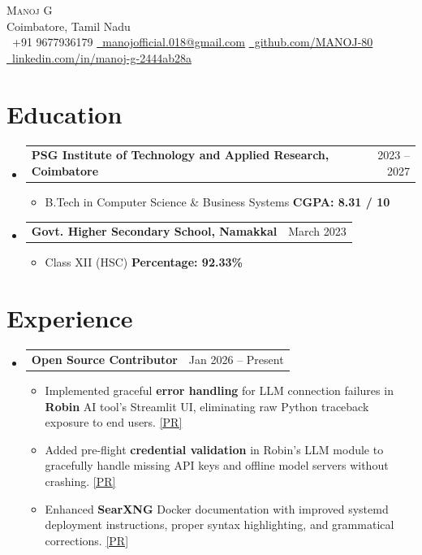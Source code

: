 \documentclass[letterpaper,11pt]{article}
\makeatletter
\newcommand{\resumeItem}[1]{\item\small{#1}}
\newcommand{\resumeSubHeadingListStart}{\begin{itemize}[leftmargin=0in, label={}]}
\newcommand{\resumeSubHeadingListEnd}{\end{itemize}}
\newcommand{\resumeItemListStart}{\begin{itemize}}
\newcommand{\resumeItemListEnd}{\end{itemize}\vspace{-6pt}}
\newcommand{\resumeProjectHeading}[2]{
\item
\begin{tabular*}{1.0\textwidth}{l@{\extracolsep{\fill}}r}
\textbf{#1} & \small #2 \\
\end{tabular*}\vspace{-4pt}
}
\makeatother
\begin{document}
\begin{center}
{\Huge \scshape Manoj G} \\ \vspace{2pt}
Coimbatore, Tamil Nadu \\ \vspace{2pt}
\small
\faPhone\ +91 9677936179 \quad
\href{mailto:manojofficial.018@gmail.com}{\faEnvelope\ manojofficial.018@gmail.com} \quad
\href{https://github.com/MANOJ-80}{\faGithub\ github.com/MANOJ-80} \quad
\href{https://www.linkedin.com/in/manoj-g-2444ab28a/}{\faLinkedin\ linkedin.com/in/manoj-g-2444ab28a}
\vspace{-8pt}
\end{center}

\section{Education}
\resumeSubHeadingListStart

  \resumeProjectHeading
    {\textbf{PSG Institute of Technology and Applied Research}, Coimbatore}{2023 -- 2027}
    \resumeItemListStart
        \resumeItem{B.Tech in Computer Science \& Business Systems \hfill \textbf{CGPA: 8.31 / 10}}
    \resumeItemListEnd

  \resumeProjectHeading
    {\textbf{Govt. Higher Secondary School}, Namakkal}{March 2023}
    \resumeItemListStart
        \resumeItem{Class XII (HSC) \hfill \textbf{Percentage: 92.33\%}}
    \resumeItemListEnd

\resumeSubHeadingListEnd

\section{Experience}
\resumeSubHeadingListStart
\resumeProjectHeading
  {\textbf{Open Source Contributor}}{Jan 2026 -- Present}
  \resumeItemListStart
    \resumeItem{Implemented graceful \textbf{error handling} for LLM connection failures in \textbf{Robin} AI tool's Streamlit UI, eliminating raw Python traceback exposure to end users. \href{https://github.com/apurvsinghgautam/robin/pull/62}{[PR]}}
    \resumeItem{Added pre-flight \textbf{credential validation} in Robin's LLM module to gracefully handle missing API keys and offline model servers without crashing. \href{https://github.com/apurvsinghgautam/robin/pull/62}{[PR]}}
    \resumeItem{Enhanced \textbf{SearXNG} Docker documentation with improved systemd deployment instructions, proper syntax highlighting, and grammatical corrections. \href{https://github.com/searxng/searxng-docker/pull/316}{[PR]} }
  \resumeItemListEnd
\resumeSubHeadingListEnd
\end{document}
